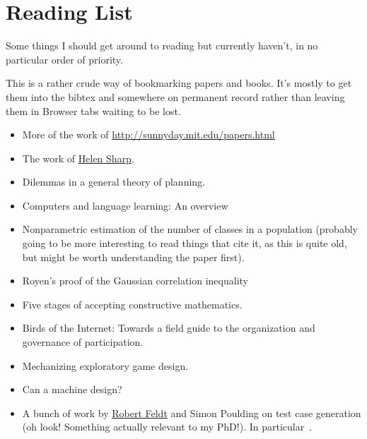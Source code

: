 \documentclass[a4paper]{book}
\begin{document}
\chapter{Reading List}

Some things I should get around to reading but currently haven't,
in no particular order of priority.

This is a rather crude way of bookmarking papers and books.
It's mostly to get them into the bibtex and somewhere on permanent record rather than leaving them in Browser tabs waiting to be lost.


\begin{itemize}
\item More of the work of \href{Nancy Leveson}{http://sunnyday.mit.edu/papers.html}
\item The work of \href{http://mcs.open.ac.uk/hcs2/}{Helen Sharp}.
\item Dilemmas in a general theory of planning\cite{rittel1973dilemmas}.
\item Computers and language learning: An overview\cite{warschauer1998computers}
\item Nonparametric estimation of the number of classes in a population\cite{chao1984nonparametric} (probably going to be more interesting to read things that cite it, as this is quite old, but might be worth understanding the paper first).
\item Royen’s proof of the Gaussian correlation inequality\cite{latala2017royen}
\item Five stages of accepting constructive mathematics\cite{bauer2017five}.
\item Birds of the Internet: Towards a field guide to the organization and governance of participation\cite{fish2011birds}.
\item Mechanizing exploratory game design\cite{smith2012mechanizing}.
\item Can a machine design?\cite{cross2001can}
\item A bunch of work by \href{http://www.robertfeldt.net/}{Robert Feldt} and Simon Poulding on test case generation
(oh look! Something actually relevant to my PhD!).
In particular~\cite{DBLP:conf/icst/PouldingF15, DBLP:conf/issre/FeldtP13, DBLP:conf/icse/FeldtP15}.
\end{itemize}

{}

\end{document}
